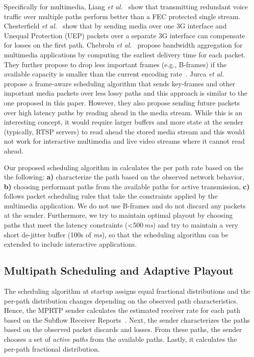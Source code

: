 Specifically for multimedia, Liang \emph{et al.}~\cite{Liang01} show that
transmitting redundant voice traffic over multiple paths perform better than a
FEC protected single stream. Chesterfield \emph{et al.}~\cite{1498479}
show that by sending media over one 3G interface and Unequal Protection (UEP)
packets over a separate 3G interface can compensate for losses on the first
path. Chebrolu \emph{et al.}~\cite{1599407} propose bandwidth aggregation for
multimedia applications by computing the earliest delivery time for each
packet. They further propose to drop less important frames (e.g., B-frames) if
the available capacity is smaller than the current encoding
rate~\cite{1313320}. Jurca \emph{et al.}~\cite{4130370:jurca} propose a
frame-aware scheduling algorithm that sends key-frames and other important
media packets over less lossy paths and this approach is similar to the one
proposed in this paper. However, they also propose sending future packets over
high latency paths by reading ahead in the media stream. While this is an
interesting concept, it would require larger buffers and more state at the
sender (typically, RTSP servers) to read ahead the stored media stream and
this would not work for interactive multimedia and live video streams where it
cannot read ahead. 

Our proposed scheduling algorithm in  calculates the per path
rate based on the the following: \textbf{a)} characterize the path based on
the observed network behavior, \textbf{b)} choosing performant paths from the
available paths for active transmission, \textbf{c)} follows packet scheduling
rules that take the constraints applied by the multimedia application. We do
not use B-frames and do not discard any packets at the sender. Furthermore, we
try to maintain optimal playout by choosing paths that meet the latency
constraints (<500\,\emph{ms}) and try to maintain a very short de-jitter
buffer (100s of \emph{ms}), so that the scheduling algorithm can be extended
to include interactive applications.

\subsection{Multipath Scheduling and Adaptive Playout}

The scheduling algorithm at startup assigns equal fractional distributions and
the per-path distribution changes depending on the observed path
characteristics. Hence, the MPRTP sender calculates the estimated receiver
rate for each path based on the Subflow Receiver Reports~\cite{draft.mprtp}.
Next, the sender characterizes the paths based on the observed packet discards
and losses. From these paths, the sender chooses a set of \emph{active paths}
from the available paths. Lastly, it calculates the per-path fractional
distribution.

